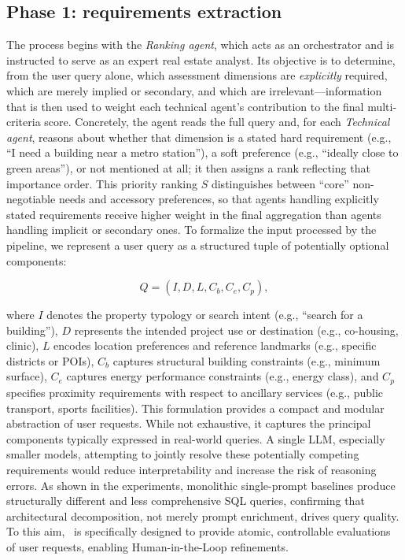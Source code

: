 \documentclass[runningheads,orivec]{llncs}
\newcommand{\rankingagent}{\textit{Ranking agent}}
\newcommand{\technicalagent}{\textit{Technical agent}}
\begin{document}
\subsection{Phase 1: requirements extraction}
\label{sec:methods_phase1}
The process begins with the \rankingagent, which acts as an orchestrator and is instructed to serve as an expert real estate analyst.
Its objective is to determine, from the user query alone, which assessment dimensions are \emph{explicitly} required, which are merely implied or secondary, and which are irrelevant—information that is then used to weight each technical agent's contribution to the final multi-criteria score.
Concretely, the agent reads the full query and, for each \technicalagent, reasons about whether that dimension is a stated hard requirement (e.g., ``I need a building near a metro station''), a soft preference (e.g., ``ideally close to green areas''), or not mentioned at all; it then assigns a rank reflecting that importance order.
This priority ranking $S$ distinguishes between ``core'' non-negotiable needs and accessory preferences, so that agents handling explicitly stated requirements receive higher weight in the final aggregation than agents handling implicit or secondary ones.
To formalize the input processed by the pipeline, we represent a user query as a structured tuple of potentially optional components:

\begin{equation}
    Q = (I, D, L, C_b, C_e, C_p),
    \label{eq:query-template}
\end{equation}

where \(I\) denotes the property typology or search intent (e.g., “search for a building”), \(D\) represents the intended project use or destination (e.g., co-housing, clinic), \(L\) encodes location preferences and reference landmarks (e.g., specific districts or POIs), \(C_b\) captures structural building constraints (e.g., minimum surface), \(C_e\) captures energy performance constraints (e.g., energy class), and \(C_p\) specifies proximity requirements with respect to ancillary services (e.g., public transport, sports facilities).
This formulation provides a compact and modular abstraction of user requests.
While not exhaustive, it captures the principal components typically expressed in real-world queries. 
A single LLM, especially smaller models, attempting to jointly resolve these potentially competing requirements would reduce interpretability and increase the risk of reasoning errors. As shown in the experiments, monolithic single-prompt baselines produce structurally different and less comprehensive SQL queries, confirming that architectural decomposition, not merely prompt enrichment, drives query quality.
To this aim, \methodACR\ is specifically designed to provide atomic, controllable evaluations of user requests, enabling Human-in-the-Loop refinements.
\end{document}
